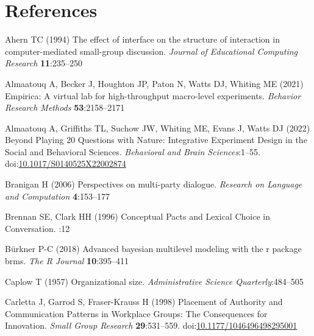 \documentclass[
  english,
]{article}
\newlength{\cslhangindent}
\newlength{\cslentryspacingunit} %
\newenvironment{CSLReferences}[2] %
 {%
  \setlength{\parindent}{0pt}
  \ifodd #1
  \let\oldpar\par
  \def\par{\hangindent=\cslhangindent\oldpar}
  \fi
  \setlength{\parskip}{#2\cslentryspacingunit}
 }%
 {}
\begin{document}
\hypertarget{references}{%
\section{References}\label{references}}

\setlength{\parindent}{-0.1in} 
\setlength{\leftskip}{0.125in}

\noindent

\hypertarget{refs}{}
\begin{CSLReferences}{1}{0}
\leavevmode{}%
Ahern TC (1994) The effect of interface on the structure of interaction in computer-mediated small-group discussion. \emph{Journal of Educational Computing Research} \textbf{11}:235--250

\leavevmode{}%
Almaatouq A, Becker J, Houghton JP, Paton N, Watts DJ, Whiting ME (2021) Empirica: A virtual lab for high-throughput macro-level experiments. \emph{Behavior Research Methods} \textbf{53}:2158--2171

\leavevmode{}%
Almaatouq A, Griffiths TL, Suchow JW, Whiting ME, Evans J, Watts DJ (2022) Beyond {Playing} 20 {Questions} with {Nature}: {Integrative Experiment Design} in the {Social} and {Behavioral Sciences}. \emph{Behavioral and Brain Sciences}:1--55. doi:\href{https://doi.org/10.1017/S0140525X22002874}{10.1017/S0140525X22002874}

\leavevmode{}%
Branigan H (2006) Perspectives on multi-party dialogue. \emph{Research on Language and Computation} \textbf{4}:153--177

\leavevmode{}%
Brennan SE, Clark HH (1996) Conceptual {Pacts} and {Lexical Choice} in {Conversation}. :12

\leavevmode{}%
Bürkner P-C (2018) Advanced bayesian multilevel modeling with the r package brms. \emph{The R Journal} \textbf{10}:395--411

\leavevmode{}%
Caplow T (1957) Organizational size. \emph{Administrative Science Quarterly}:484--505

\leavevmode{}%
Carletta J, Garrod S, Fraser-Krauss H (1998) Placement of {Authority} and {Communication Patterns} in {Workplace Groups}: {The Consequences} for {Innovation}. \emph{Small Group Research} \textbf{29}:531--559. doi:\href{https://doi.org/10.1177/1046496498295001}{10.1177/1046496498295001}


\end{CSLReferences}
\end{document}
